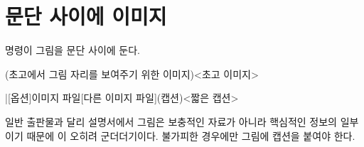 \documentclass[pairquote, minted]{hzguide}
\begin{document}
\section{문단 사이에 이미지}

\macro{\image} 명령이 그림을 문단 사이에 둔다.

\begin{coderesult}
(초고에서 그림 자리를 보여주기 위한 이미지)<초고 이미지>
\end{coderesult}

\begin{code}
\image*|[옵션]{이미지 파일}[다른 이미지 파일](캡션)<짧은 캡션>
\end{code}

일반 출판물과 달리 설명서에서 그림은 보충적인 자료가 아니라 핵심적인 정보의 일부이기 때문에 이 오히려 군더더기이다. 불가피한 경우에만 그림에 캡션을 붙여야 한다.
\end{document}
